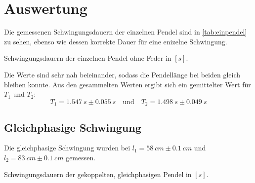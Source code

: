\section{Auswertung}
\label{sec:Auswertung}

Die gemessenen Schwingungsdauern der einzelnen Pendel sind in \autoref{tab:einpendel} zu sehen, ebenso wie dessen korrekte Dauer für eine enizelne Schwingung.

\begin{table}
  \centering
  \caption{Schwingungsdauern der einzelnen Pendel ohne Feder in $[s]$.}
  \label{tab:einpendel}
\end{table}

Die Werte sind sehr nah beieinander, sodass die Pendellänge bei beiden gleich bleiben konnte.
Aus den gesammelten Werten ergibt sich ein gemittelter Wert für $T_1$ und $T_2$:
\begin{equation}
  T_1 = 1.547\ s \pm 0.055\ s \quad\textrm{und}\quad T_2 = 1.498\ s \pm 0.049\ s
\end{equation}
\subsection{Gleichphasige Schwingung}
Die gleichphasige Schwingung wurden bei $l_1 = 58\ cm\pm 0.1\ cm$ und $l_2 = 83\ cm\pm 0.1\ cm$ gemessen.

\begin{table}
  \centering
  \caption{Schwingungsdauern der gekoppelten, gleichphasigen Pendel in $[s]$.}
  \label{tab:gleichpendel}
\end{table}

